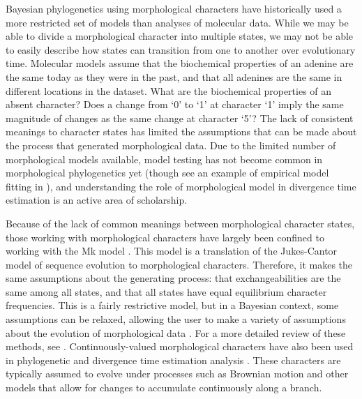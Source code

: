 \documentclass[11pt]{article}
\begin{document}
Bayesian phylogenetics using morphological characters have
historically used a more restricted set of models than analyses of molecular data.
While we may be able to divide a morphological character into multiple states, we may not be able to easily describe how states can transition from one to another over evolutionary time.
Molecular models assume that the biochemical properties of an adenine are the same today as they were in the past, and
that all adenines are the same in different locations in the dataset.
What are the biochemical properties of an absent character?
Does a change from `0' to `1' at character `1' imply the same magnitude of changes as the same change at character `5'?
The lack of consistent meanings to character states has limited the assumptions that can be made about the process that generated morphological data.
Due to the limited number of morphological models available, model testing has not become common in morphological phylogenetics yet (though see an example of empirical model fitting in \cite*{bapst2017}), and understanding the role of morphological model in divergence time estimation is an active area of scholarship. 

Because of the lack of common meanings between morphological character states, those working with morphological characters have largely been confined to working with the Mk model \cite{Lewis2001}.
This model is a translation of the Jukes-Cantor model \cite{Jukes1969} of sequence evolution to morphological characters.
Therefore, it makes the same assumptions about the generating process: that exchangeabilities are the same among all states, and that all states have equal equilibrium character frequencies.
This is a fairly restrictive model, but in a Bayesian context, some assumptions can be relaxed, allowing the user to make a variety of assumptions about the evolution of morphological data \cite{Nylander2004, Wright2016}.
For a more detailed review of these methods, see \cite{Wright2019}. 
Continuously-valued morphological characters have also been used in phylogenetic  \cite{goloboff2006, parins2017} and divergence time estimation analysis \cite{AlvarezC2019}.
These characters are typically assumed to evolve under processes such as Brownian motion and other models that allow for changes to accumulate continuously along a branch.  
\end{document}
